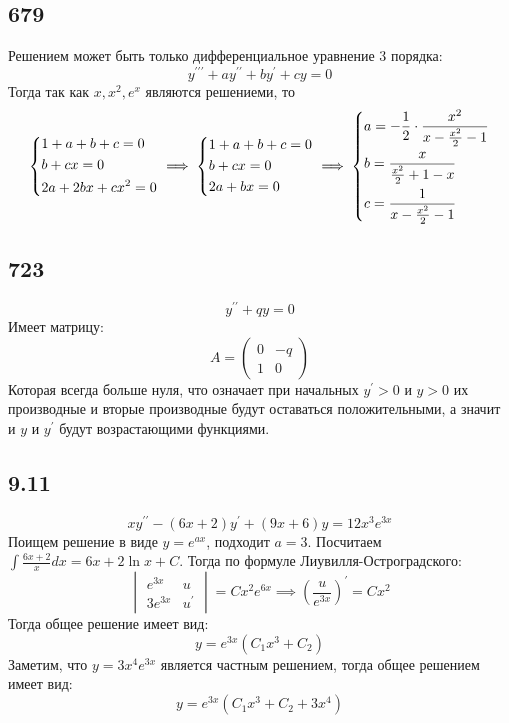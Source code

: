 \documentclass[12pt]{article}
\begin{document}
\subsection*{679}
Решением может быть только дифференциальное уравнение 3 порядка: 
\[
    y^{\prime\prime\prime} + a y^{\prime\prime} + b y^{\prime} + c y = 0
\] 
Тогда так как $x, x^2, e^x$ являются решениеми, то 
\[
    \begin{dcases}
        1 + a + b + c = 0 \\
        b + cx = 0 \\
        2a + 2b x + c x^2 = 0
    \end{dcases} \implies 
    \begin{dcases}
        1 + a + b + c = 0 \\
        b + cx = 0 \\
        2a + bx = 0
    \end{dcases} \implies 
    \begin{dcases}
        a = -\frac{1}{2} \cdot \frac{x^2}{x - \frac{x^2}{2} - 1} \\
        b = \frac{x}{\frac{x^2}{2} + 1 - x} \\
        c = \frac{1}{x - \frac{x^2}{2} - 1}
    \end{dcases}
\] 

\subsection*{723}
\[
    y^{\prime\prime} + q y = 0
\]
Имеет матрицу: 
\[
    A = \begin{pmatrix}
        0 & -q \\
        1 & 0
    \end{pmatrix}
\]
Которая всегда больше нуля, что означает при начальных $y^{\prime} > 0$ и $y > 0$ их производные и вторые производные  
будут оставаться положительными, а значит и $y$ и $y^{\prime}$ будут возрастающими функциями. 

\subsection*{9.11}
\[
    xy^{\prime\prime} - (6x + 2) y^{\prime} + (9x + 6) y = 12 x^3 e^{3x}
\]
Поищем решение в виде $y = e^{ax}$, подходит $a = 3$. 
Посчитаем $\int \frac{6x + 2}{x} dx = 6x + 2\ln x + C$. 
Тогда по формуле Лиувилля-Остроградского: 
\[
    \begin{vmatrix}
        e^{3x} & u \\ 
        3 e^{3x} &  u^{\prime}  
    \end{vmatrix} = 
    C x^2 e^{6x} \implies 
    \left( \frac{u}{e^{3x}} \right)^{\prime} = C x^2 
\] 
Тогда общее решение имеет вид: 
\[
    y = e^{3x} (C_1 x^3 + C_2) 
\]
Заметим, что $y = 3 x^4 e^{3x}$ является частным решением, тогда общее решением имеет вид: 
\[
    y = e^{3x}(C_1 x^3 + C_2 + 3x^4) 
\] 
\end{document}
